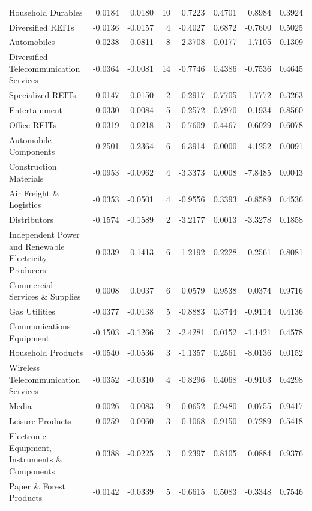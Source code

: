 \begin{table}
\begin{tabular}{lrrrrrrr}
Household Durables & 0.0184 & 0.0180 & 10 & 0.7223 & 0.4701 & 0.8984 & 0.3924 \\
Diversified REITs & -0.0136 & -0.0157 & 4 & -0.4027 & 0.6872 & -0.7600 & 0.5025 \\
Automobiles & -0.0238 & -0.0811 & 8 & -2.3708 & 0.0177 & -1.7105 & 0.1309 \\
Diversified Telecommunication Services & -0.0364 & -0.0081 & 14 & -0.7746 & 0.4386 & -0.7536 & 0.4645 \\
Specialized REITs & -0.0147 & -0.0150 & 2 & -0.2917 & 0.7705 & -1.7772 & 0.3263 \\
Entertainment & -0.0330 & 0.0084 & 5 & -0.2572 & 0.7970 & -0.1934 & 0.8560 \\
Office REITs & 0.0319 & 0.0218 & 3 & 0.7609 & 0.4467 & 0.6029 & 0.6078 \\
Automobile Components & -0.2501 & -0.2364 & 6 & -6.3914 & 0.0000 & -4.1252 & 0.0091 \\
Construction Materials & -0.0953 & -0.0962 & 4 & -3.3373 & 0.0008 & -7.8485 & 0.0043 \\
Air Freight \& Logistics & -0.0353 & -0.0501 & 4 & -0.9556 & 0.3393 & -0.8589 & 0.4536 \\
Distributors & -0.1574 & -0.1589 & 2 & -3.2177 & 0.0013 & -3.3278 & 0.1858 \\
Independent Power and Renewable Electricity Producers & 0.0339 & -0.1413 & 6 & -1.2192 & 0.2228 & -0.2561 & 0.8081 \\
Commercial Services \& Supplies & 0.0008 & 0.0037 & 6 & 0.0579 & 0.9538 & 0.0374 & 0.9716 \\
Gas Utilities & -0.0377 & -0.0138 & 5 & -0.8883 & 0.3744 & -0.9114 & 0.4136 \\
Communications Equipment & -0.1503 & -0.1266 & 2 & -2.4281 & 0.0152 & -1.1421 & 0.4578 \\
Household Products & -0.0540 & -0.0536 & 3 & -1.1357 & 0.2561 & -8.0136 & 0.0152 \\
Wireless Telecommunication Services & -0.0352 & -0.0310 & 4 & -0.8296 & 0.4068 & -0.9103 & 0.4298 \\
Media & 0.0026 & -0.0083 & 9 & -0.0652 & 0.9480 & -0.0755 & 0.9417 \\
Leisure Products & 0.0259 & 0.0060 & 3 & 0.1068 & 0.9150 & 0.7289 & 0.5418 \\
Electronic Equipment, Instruments \& Components & 0.0388 & -0.0225 & 3 & 0.2397 & 0.8105 & 0.0884 & 0.9376 \\
Paper \& Forest Products & -0.0142 & -0.0339 & 5 & -0.6615 & 0.5083 & -0.3348 & 0.7546 \\

\end{tabular}
\end{table}
